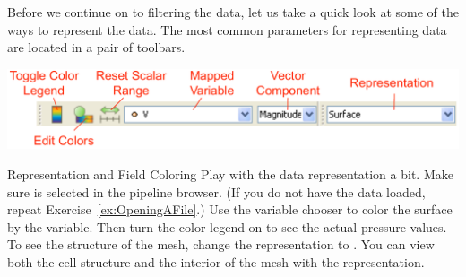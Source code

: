 Before we continue on to filtering the data, let us take a quick look at
some of the ways to represent the data.  The most common parameters for
representing data are located in a pair of toolbars.

\begin{inlinefig}
  \includegraphics[width=\linewidth]{images/DataRepresentationToolbars}
\end{inlinefig}

\begin{exercise}{Representation and Field Coloring}
  \label{ex:RepresentationAndFieldColoring}%
  Play with the data representation a bit.  Make sure
   is selected in the pipeline browser.  (If you do
  not have the data loaded, repeat Exercise~\ref{ex:OpeningAFile}.)  Use
  the variable chooser to color the surface by the  variable.
  Then turn the color legend on to see the actual pressure values.  To see
  the structure of the mesh, change the representation to .  You can view both the cell structure and the interior of the
  mesh with the  representation.


\end{exercise}
